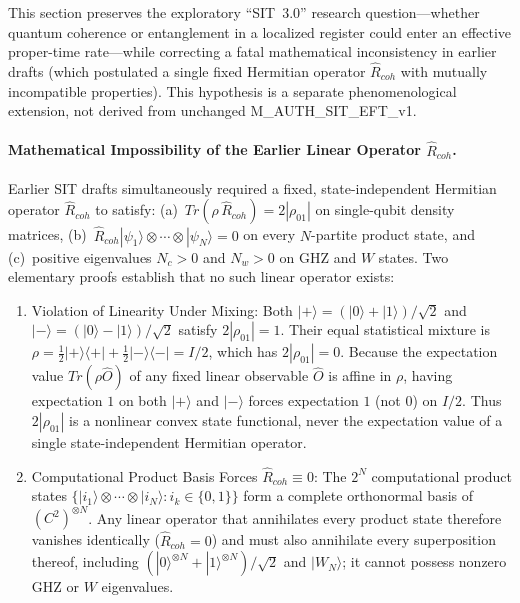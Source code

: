 \documentclass[american,11pt,letterpaper]{article}
\def\mathbb#1{#1}%
\def\mathcal#1{#1}%
\def\mathrm#1{#1}%
\def\texttt#1{#1}%
\def\emph#1{#1}%
\begin{document}
This section preserves the exploratory ``SIT~3.0'' research question---whether quantum coherence or entanglement in a localized register could enter an effective proper-time rate---while correcting a fatal mathematical inconsistency in earlier drafts (which postulated a single fixed Hermitian operator $\hat{\mathcal{R}}_{\mathrm{coh}}$ with mutually incompatible properties). This hypothesis is a \emph{separate phenomenological extension}, not derived from unchanged \texttt{M\_AUTH\_SIT\_EFT\_v1}.

\paragraph{Mathematical Impossibility of the Earlier Linear Operator $\hat{\mathcal{R}}_{\mathrm{coh}}$.}
Earlier SIT drafts simultaneously required a fixed, state-independent Hermitian operator $\hat{\mathcal{R}}_{\mathrm{coh}}$ to satisfy: (a)~$\mathrm{Tr}(\rho\,\hat{\mathcal{R}}_{\mathrm{coh}}) = 2|\rho_{01}|$ on single-qubit density matrices, (b)~$\hat{\mathcal{R}}_{\mathrm{coh}}|\psi_1\rangle\otimes\cdots\otimes|\psi_N\rangle = 0$ on every $N$-partite product state, and (c)~positive eigenvalues $N_c > 0$ and $N_w > 0$ on GHZ and $W$ states. Two elementary proofs establish that no such linear operator exists:
\begin{enumerate}[leftmargin=2em]
  \item \emph{Violation of Linearity Under Mixing:} Both $|+\rangle = (|0\rangle + |1\rangle)/\sqrt{2}$ and $|-\rangle = (|0\rangle - |1\rangle)/\sqrt{2}$ satisfy $2|\rho_{01}| = 1$. Their equal statistical mixture is $\rho = \frac{1}{2}|+\rangle\langle +| + \frac{1}{2}|-\rangle\langle -| = I/2$, which has $2|\rho_{01}| = 0$. Because the expectation value $\mathrm{Tr}(\rho\hat{O})$ of any fixed linear observable $\hat{O}$ is affine in $\rho$, having expectation $1$ on both $|+\rangle$ and $|-\rangle$ forces expectation $1$ (not $0$) on $I/2$. Thus $2|\rho_{01}|$ is a \emph{nonlinear} convex state functional, never the expectation value of a single state-independent Hermitian operator.
  \item \emph{Computational Product Basis Forces $\hat{\mathcal{R}}_{\mathrm{coh}} \equiv 0$:} The $2^N$ computational product states $\{|i_1\rangle\otimes\cdots\otimes|i_N\rangle : i_k \in \{0,1\}\}$ form a complete orthonormal basis of $(\mathbb{C}^2)^{\otimes N}$. Any linear operator that annihilates every product state therefore vanishes identically ($\hat{\mathcal{R}}_{\mathrm{coh}} = 0$) and must also annihilate every superposition thereof, including $(|0\rangle^{\otimes N} + |1\rangle^{\otimes N})/\sqrt{2}$ and $|W_N\rangle$; it cannot possess nonzero GHZ or $W$ eigenvalues.
\end{enumerate}
\end{document}
